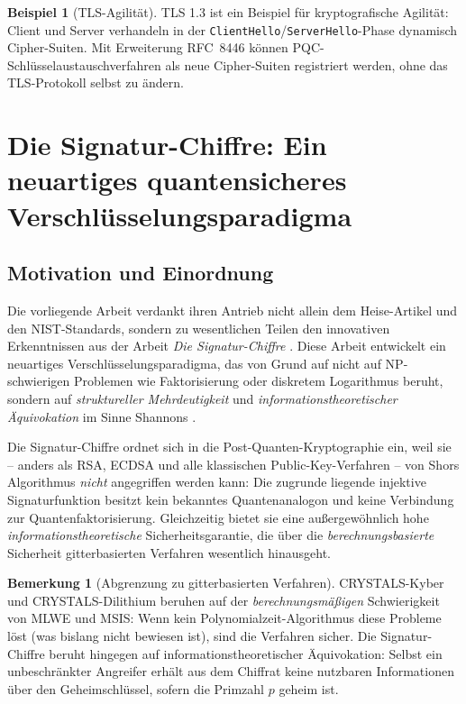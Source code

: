 ﻿\documentclass[a4paper,12pt]{article}
\theoremstyle{definition}
\newtheorem{bemerkung}{Bemerkung}[section]
\newtheorem{beispiel}{Beispiel}[section]
\begin{document}
\begin{beispiel}[TLS-Agilit\"at]
TLS 1.3 \cite{Res18} ist ein Beispiel für kryptografische Agilität:
Client und Server verhandeln in der \texttt{ClientHello}/\texttt{ServerHello}-Phase
dynamisch Cipher-Suiten. Mit Erweiterung RFC~8446 können PQC-Schlüsselaustauschverfahren
als neue Cipher-Suiten registriert werden, ohne das TLS-Protokoll selbst zu ändern.
\end{beispiel}

\section{Die Signatur-Chiffre: Ein neuartiges quantensicheres Verschlüsselungsparadigma}

\subsection{Motivation und Einordnung}

Die vorliegende Arbeit verdankt ihren Antrieb nicht allein dem Heise-Artikel
\cite{Hei26} und den NIST-Standards, sondern zu wesentlichen Teilen den
innovativen Erkenntnissen aus der Arbeit \emph{Die Signatur-Chiffre}
\cite{Epp26b}. Diese Arbeit entwickelt ein neuartiges Verschlüsselungsparadigma,
das von Grund auf nicht auf NP-schwierigen Problemen wie Faktorisierung oder
diskretem Logarithmus beruht, sondern auf \emph{struktureller Mehrdeutigkeit}
und \emph{informationstheoretischer Äquivokation} im Sinne Shannons \cite{Sha49}.

Die Signatur-Chiffre ordnet sich in die Post-Quanten-Kryptographie ein,
weil sie -- anders als RSA, ECDSA und alle klassischen Public-Key-Verfahren --
von Shors Algorithmus \emph{nicht} angegriffen werden kann:
Die zugrunde liegende injektive Signaturfunktion besitzt kein bekanntes
Quantenanalogon und keine Verbindung zur Quantenfaktorisierung.
Gleichzeitig bietet sie eine außergewöhnlich hohe \emph{informationstheoretische}
Sicherheitsgarantie, die über die \emph{berechnungsbasierte} Sicherheit
gitterbasierten Verfahren wesentlich hinausgeht.

\begin{bemerkung}[Abgrenzung zu gitterbasierten Verfahren]
CRYSTALS-Kyber und CRYSTALS-Dilithium beruhen auf der \emph{berechnungsmäßigen}
Schwierigkeit von MLWE und MSIS: Wenn kein Polynomialzeit-Algorithmus diese
Probleme löst (was bislang nicht bewiesen ist), sind die Verfahren sicher.
Die Signatur-Chiffre beruht hingegen auf informationstheoretischer Äquivokation:
Selbst ein unbeschränkter Angreifer erhält aus dem Chiffrat keine nutzbaren
Informationen über den Geheimschlüssel, sofern die Primzahl $p$ geheim ist.
\end{bemerkung}
\end{document}
